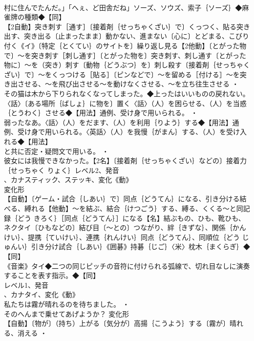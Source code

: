 \documentclass[8pt]{extreport}
\begin{document}
\begin{CJK}{UTF8}{min}
\\	村に住んでたんだ。」「へぇ、ど田舎だね」ソーズ、ソウズ、索子｛ソーズ｝◆麻雀牌の種類◆【同】
\\	【2自動】突き刺す［通す］〔接着剤｛せっちゃくざい｝で〕くっつく、貼る突き出す、突き出る〔止まったまま〕動かない、進まない〔心に〕とどまる、こびり付く《イ》〔特定｛とくてい｝のサイトを〕繰り返し見る【2他動】〔とがった物で〕～を突き刺す［刺し通す］〔とがった物を〕突き刺す、刺し通す〔とがった物に〕～を（突き）刺す〔動物｛どうぶつ｝を〕刺し殺す〔接着剤｛せっちゃくざい｝で〕～をくっつける［貼る］〔ピンなどで〕～を留める［付ける］～を突き出させる、～を飛び出させる～を動けなくさせる、～を立ち往生させる ・
\\	その猫は木から下りられなくなってしまった。◆上ったはいいものの戻れない。〈話〉〔ある場所｛ばしょ｝に物を〕置く〈話〉（人）を困らせる、（人）を当惑｛とうわく｝させる◆【用法】通例、受け身で用いられる。 ・
\\	弱ったなあ。〈話〉（人）をだます、（人）を利用｛りよう｝する◆【用法】通例、受け身で用いられる。〈英話〉（人）を我慢｛がまん｝する、（人）を受け入れる◆【用法】
\\	と共に否定・疑問文で用いる。 ・
\\	彼女には我慢できなかった。【2名】〔接着剤｛せっちゃくざい｝などの〕接着力｛せっちゃく りょく｝レベル2、発音
\\	、カナスティック、ステッキ、変化《動》
\\	変化形 
\\	【自動】〔ゲーム・試合｛しあい｝で〕同点｛どうてん｝になる、引き分ける結べる、縛れる【他動】～を結ぶ、結合｛けつごう｝する、縛る、くくる～と同記録｛どう きろく｝［同点｛どうてん｝］になる【名】結ぶもの、ひも、靴ひも、ネクタイ〔ひもなどの〕結び目〔～との〕つながり、絆｛きずな｝、関係｛かんけい｝、提携｛ていけい｝、連携｛れんけい｝同点｛どうてん｝、同順位｛どう じゅんい｝引き分け試合｛しあい｝《囲碁》持碁｛じご｝〈米〉枕木｛まくらぎ｝◆【同】
\\	《音楽》タイ◆二つの同じピッチの音符に付けられる弧線で、切れ目なしに演奏することを表す指示。◆【同】
\\	レベル1、発音
\\	、カナタイ、変化《動》
\\	私たちは霧が晴れるのを待ちました。 ・
\\	そのへんまで乗せてあげようか？	変化形 
\\	【自動】〔物が〕（持ち）上がる〔気分が〕高揚｛こうよう｝する〔霧が〕晴れる、消える ・

\end{CJK}
\end{document}
